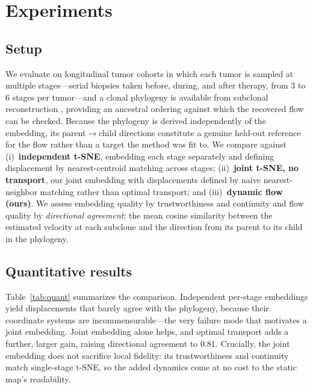 \documentclass{article}
\begin{document}
\section{Experiments}

\subsection{Setup}

We evaluate on longitudinal tumor cohorts in which each tumor is sampled at multiple
stages---serial biopsies taken before, during, and after therapy, from $3$ to $6$
stages per tumor---and a clonal phylogeny is available from subclonal reconstruction
\citep{Deshwar2015}, providing an ancestral ordering against which the recovered flow
can be checked. Because the phylogeny is derived independently of the embedding, its
parent$\rightarrow$child directions constitute a genuine held-out reference for the
flow rather than a target the method was fit to. We compare against (i)~\textbf{independent t-SNE}, embedding each stage
separately and defining displacement by nearest-centroid matching across stages;
(ii)~\textbf{joint t-SNE, no transport}, our joint embedding with displacements
defined by naive nearest-neighbor matching rather than optimal transport; and
(iii)~\textbf{dynamic flow (ours)}. We assess embedding quality by trustworthiness and
continuity \citep{Venna2006} and flow quality by \emph{directional agreement}: the
mean cosine similarity between the estimated velocity at each subclone and the
direction from its parent to its child in the phylogeny.

\subsection{Quantitative results}

Table~\ref{tab:quant} summarizes the comparison. Independent per-stage embeddings
yield displacements that barely agree with the phylogeny, because their coordinate
systems are incommensurable---the very failure mode that motivates a joint embedding.
Joint embedding alone helps, and optimal transport adds a further, larger gain,
raising directional agreement to $0.81$. Crucially, the joint embedding does not
sacrifice local fidelity: its trustworthiness and continuity match single-stage t-SNE,
so the added dynamics come at no cost to the static map's readability.
\end{document}
